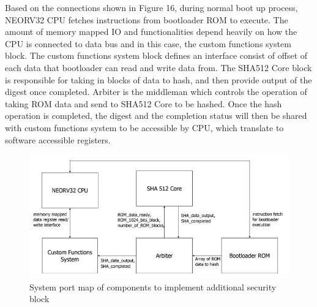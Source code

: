 \documentclass[]{rsos}%
\begin{document}
Based on the connections shown in Figure 16, during normal boot up process, NEORV32 CPU fetches instructions from bootloader ROM to execute. The amount of memory mapped IO and functionalities depend heavily on how the CPU is connected to data bus and in this case, the custom functions system block. The custom functions system block defines an interface consist of offset of each data that bootloader can read and write data from. The SHA512 Core block is responsible for taking in blocks of data to hash, and then provide output of the digest once completed. Arbiter is the middleman which controls the operation of taking ROM data and send to SHA512 Core to be hashed. Once the hash operation is completed, the digest and the completion status will then be shared with custom functions system to be accessible by CPU, which translate to software accessible registers.

\begin{figure}[hbt!]
	\centering
	\includegraphics[width=1\textwidth]{figs/SystemPortMap-Amended.JPG}
	\caption{System port map of components to implement additional security block}
\end{figure}
\end{document}
